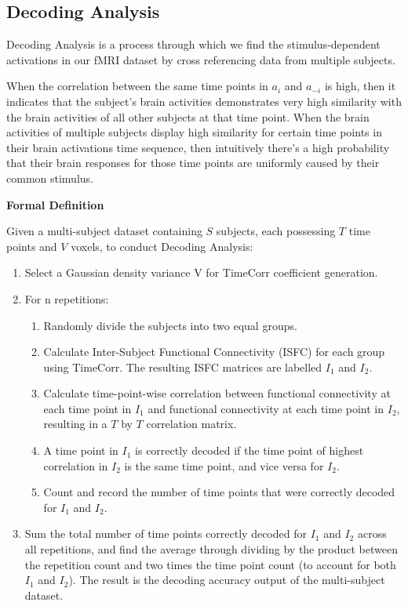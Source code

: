 \documentclass[12pt]{article}
\begin{document}
\subsection{Decoding Analysis}
Decoding Analysis is a process through which we find the stimulus-dependent activations in our fMRI dataset by cross referencing data from multiple subjects.

When the correlation between the same time points in $a_i$ and $a_{-i}$ is high, then it indicates that the subject's brain activities demonstrates very high similarity with the brain activities of all other subjects at that time point. When the brain activities of multiple subjects display high similarity for certain time points in their brain activations time sequence, then intuitively there's a high probability that their brain responses for those time points are uniformly caused by their common stimulus.

\large{\textbf{Formal Definition}}

\normalsize
Given a multi-subject dataset containing $S$ subjects, each possessing $T$ time points and $V$ voxels, to conduct Decoding Analysis:
\begin{enumerate}
\item Select a Gaussian density variance V for TimeCorr coefficient generation.
\item For n repetitions:
\begin{enumerate}
\item Randomly divide the subjects into two equal groups.
\item Calculate Inter-Subject Functional Connectivity (ISFC) for each group using TimeCorr. The resulting ISFC matrices are labelled $I_1$ and $I_2$.
\item Calculate time-point-wise correlation between functional connectivity at each time point in $I_1$ and functional connectivity at each time point in $I_2$, resulting in a $T$ by $T$ correlation matrix.
\item A time point in $I_1$ is correctly decoded if the time point of highest correlation in $I_2$ is the same time point, and vice versa for $I_2$.
\item Count and record the number of time points that were correctly decoded for $I_1$ and $I_2$.
\end{enumerate}
\item Sum the total number of time points correctly decoded for $I_1$ and $I_2$ across all repetitions, and find the average through dividing by the product between the repetition count and two times the time point count (to account for both $I_1$ and $I_2$). The result is the decoding accuracy output of the multi-subject dataset.
\end{enumerate}
\end{document}
